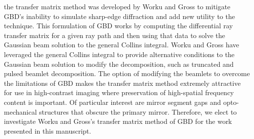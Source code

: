  the transfer matrix method was developed by Worku and Gross\cite{worku_vectorial_2017,Worku:18,Worku19} to mitigate GBD's inability to simulate sharp-edge diffraction and add new utility to the technique. This formulation of GBD works by computing the differential ray transfer matrix for a given ray path and then using that data to solve the Gaussian beam solution to the general Collins integral\cite{Collins:70}. Worku and Gross have leveraged the general Collins integral to provide alternative conditions to the Gaussian beam solution to modify the decomposition, such as truncated\cite{Worku19} and pulsed\cite{Worku:20} beamlet decomposition. The option of modifying the  beamlets to overcome the limitations of GBD makes the transfer matrix method extremely attractive for use in high-contrast imaging where preservation of high-spatial frequency content is important. Of particular interest are mirror segment gaps and opto-mechanical structures that obscure the primary mirror. Therefore, we elect to investigate Worku and Gross's transfer matrix method of GBD for the work presented in this manuscript. 


